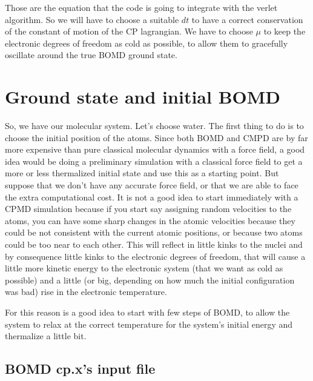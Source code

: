 \documentclass{article}
\begin{document}
Those are the equation that the code is going to integrate with the verlet algorithm. So we will have to choose a suitable $dt$ to have a correct conservation of the constant of motion of the CP lagrangian. We have to choose $\mu$ to keep the electronic degrees of freedom as cold as possible, to allow them to gracefully oscillate around the true BOMD ground state.

\section{Ground state and initial BOMD}

So, we have our molecular system. Let's choose water. The first thing to do is to choose the initial position of the atoms. Since both BOMD and CMPD are by far more expensive than pure classical molecular dynamics with a force field, a good idea would be doing a preliminary simulation with a classical force field to get a more or less thermalized initial state and use this as a starting point. But suppose that we don't have any accurate force field, or that we are able to face the extra computational cost.
It is not a good idea to start immediately with a CPMD simulation because if you start say assigning random velocities to the atoms, you can have some sharp changes in the atomic velocities because they could be not consistent with the current atomic positions, or because two atoms could be too near to each other. This will reflect in little kinks to the nuclei and by consequence little kinks to the electronic degrees of freedom, that will cause a little more kinetic energy to the electronic system (that we want as cold as possible) and a little (or big, depending on how much the initial configuration was bad) rise in the electronic temperature. 

For this reason is a good idea to start with few steps of BOMD, to allow the system to relax at the correct temperature for the system's initial energy and thermalize a little bit.
\subsection{BOMD cp.x's input file}
\end{document}
